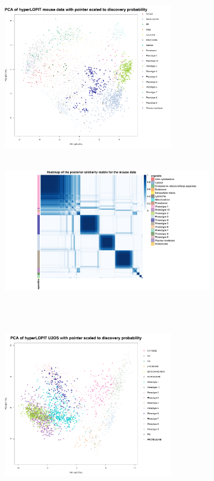 \documentclass[12pt,english]{article}
\begin{document}
\begin{figure}[ht]
	\begin{subfigure}[t]{0.5\textwidth}
		\centering
		\includegraphics[height=2.5in]{pcaMousehl.pdf}
		\caption{}
	\end{subfigure}
	\begin{subfigure}[t]{0.5\textwidth}
		\centering
		\includegraphics[height=2.5in]{heatmapMousehl.jpg}
		\caption{}
	\end{subfigure}
~
	\begin{subfigure}[t]{0.5\textwidth}
	\centering
	\includegraphics[height=2.5in]{pcau2oshl.pdf}
	\caption{}
\end{subfigure}
\begin{subfigure}[t]{0.5\textwidth}

\end{subfigure}
\end{figure}
\end{document}
